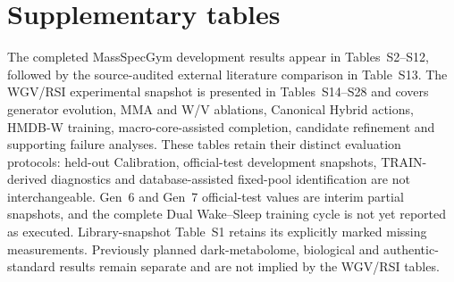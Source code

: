 \documentclass[12pt]{article}
\begin{document}
\section{Supplementary tables}

The completed MassSpecGym development results appear in Tables~S2--S12, followed by the source-audited external literature comparison in Table~S13. The WGV/RSI experimental snapshot is presented in Tables~S14--S28 and covers generator evolution, MMA and W/V ablations, Canonical Hybrid actions, HMDB-W training, macro-core-assisted completion, candidate refinement and supporting failure analyses. These tables retain their distinct evaluation protocols: held-out Calibration, official-test development snapshots, TRAIN-derived diagnostics and database-assisted fixed-pool identification are not interchangeable. Gen~6 and Gen~7 official-test values are interim partial snapshots, and the complete Dual Wake--Sleep training cycle is not yet reported as executed. Library-snapshot Table~S1 retains its explicitly marked missing measurements. Previously planned dark-metabolome, biological and authentic-standard results remain separate and are not implied by the WGV/RSI tables.







\end{document}
